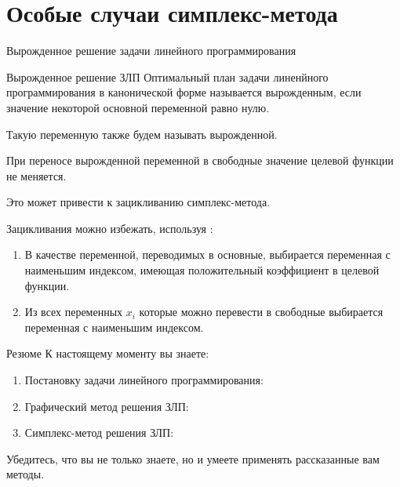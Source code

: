 \documentclass[unicode,11pt,notheorems]{beamer}
\begin{document}
\section{Особые случаи симплекс-метода}
\begin{frame}{}{}
\centering 
\Large Вырожденное решение задачи линейного программирования
\end{frame}
\begin{frame}{Вырожденное решение ЗЛП}{}
Оптимальный план задачи линенйного программирования в канонической форме называется \alert{вырожденным}, если значение некоторой основной переменной равно нулю.

Такую переменную также будем называть вырожденной.

\bigskip

{\color{red}
При переносе вырожденной переменной в свободные значение целевой функции не меняется.

Это может привести к зацикливанию симплекс-метода.
}

\bigskip

Зацикливания можно избежать, используя :
\begin{enumerate}
\item 
	В качестве переменной, переводимых в основные, выбирается переменная с наименьшим индексом, имеющая положительный коэффициент в целевой функции.
\item 
	Из всех переменных $x_i$ которые можно перевести в свободные выбирается переменная с наименьшим индексом.
\end{enumerate}
\end{frame}



\begin{frame}{Резюме}
	К настоящему моменту вы знаете:
	\begin{enumerate}
	\item 
		Постановку  задачи линейного программирования: 
	\item 
		Графический метод  решения ЗЛП: 
	\item 
		Симплекс-метод решения ЗЛП: 
	\end{enumerate}
	Убедитесь, что вы не только знаете, но и умеете применять рассказанные вам методы.
\end{frame}
\end{document}

